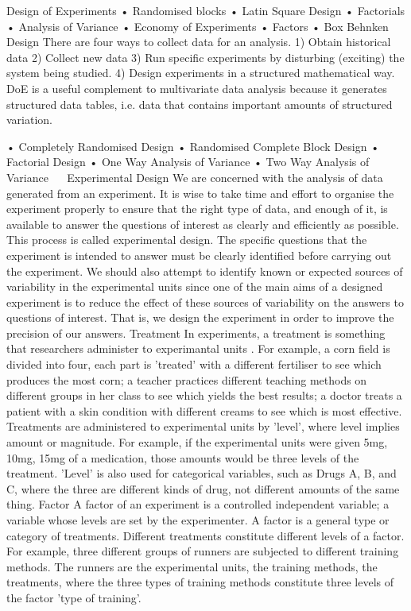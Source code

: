 Design of Experiments
•	Randomised blocks
•	Latin Square Design
•	Factorials
•	Analysis of Variance
•	Economy of Experiments
•	Factors
•	Box Behnken Design
There are four ways to collect data for an analysis.
1)	Obtain historical data
2)	Collect new data
3)	Run specific experiments by disturbing (exciting) the system being studied.
4)	Design experiments in a structured mathematical way.
DoE is a useful complement to multivariate data analysis because it generates  structured data tables, i.e. data that contains important amounts of structured variation.

•	Completely Randomised Design
•	Randomised Complete Block Design
•	Factorial Design
•	One Way Analysis of Variance
•	Two Way Analysis of Variance
 
Experimental Design 
We are concerned with the analysis of data generated from an experiment. It is wise to take time and effort to organise the experiment properly to ensure that the right type of data, and enough of it, is available to answer the questions of interest as clearly and efficiently as possible. This process is called experimental design.
The specific questions that the experiment is intended to answer must be clearly identified before carrying out the experiment. We should also attempt to identify known or expected sources of variability in the experimental units since one of the main aims of a designed experiment is to reduce the effect of these sources of variability on the answers to questions of interest. That is, we design the experiment in order to improve the precision of our answers.
Treatment 
In experiments, a treatment is something that researchers administer to experimantal units . For example, a corn field is divided into four, each part is 'treated' with a different fertiliser to see which produces the most corn; a teacher practices different teaching methods on different groups in her class to see which yields the best results; a doctor treats a patient with a skin condition with different creams to see which is most effective.
Treatments are administered to experimental units by 'level', where level implies amount or magnitude. For example, if the experimental units were given 5mg, 10mg, 15mg of a medication, those amounts would be three levels of the treatment. 'Level' is also used for categorical variables, such as Drugs A, B, and C, where the three are different kinds of drug, not different amounts of the same thing.
Factor 
A factor of an experiment is a controlled independent variable; a variable whose levels are set by the experimenter.
A factor is a general type or category of treatments. Different treatments constitute different levels of a factor. For example, three different groups of runners are subjected to different training methods. The runners are the experimental units, the training methods, the treatments, where the three types of training methods constitute three levels of the factor 'type of training'.
